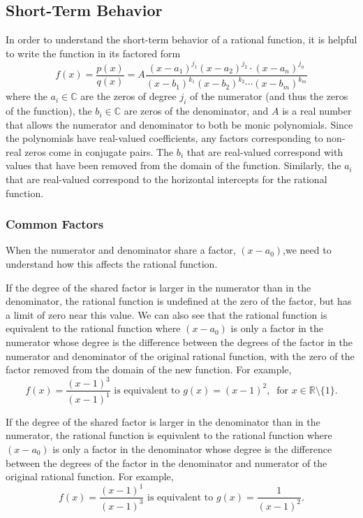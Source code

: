 \documentclass[
]{book}
\theoremstyle{definition}
\theoremstyle{definition}
\theoremstyle{definition}
\theoremstyle{definition}
\theoremstyle{remark}
\begin{document}
\hypertarget{short-term-behavior-1}{%
\subsection{Short-Term Behavior}\label{short-term-behavior-1}}

In order to understand the short-term behavior of a rational function, it is helpful to write the function in its factored form
\[f(x)=\frac{p(x)}{q(x)} = A\frac{ (x-a_1)^{j_1} (x-a_2)^{j_2} \cdot (x-a_n)^{j_n}}{(x-b_1)^{k_1} (x-b_2)^{k_2} \cdots (x-b_m)^{k_m}}\] where the \(a_i\in \mathbb{C}\) are the zeros of degree \(j_i\) of the numerator (and thus the zeros of the function), the \(b_i\in \mathbb{C}\) are zeros of the denominator, and \(A\) is a real number that allows the numerator and denominator to both be monic polynomials. Since the polynomials have real-valued coefficients, any factors corresponding to non-real zeros come in conjugate pairs. The \(b_i\) that are real-valued correspond with values that have been removed from the domain of the function. Similarly, the \(a_i\) that are real-valued correspond to the horizontal intercepts for the rational function.

\hypertarget{common-factors}{%
\subsubsection{Common Factors}\label{common-factors}}

When the numerator and denominator share a factor, \((x-a_0)\),we need to understand how this affects the rational function.

If the degree of the shared factor is larger in the numerator than in the denominator, the rational function is undefined at the zero of the factor, but has a limit of zero near this value. We can also see that the rational function is equivalent to the rational function where \((x-a_0)\) is only a factor in the numerator whose degree is the difference between the degrees of the factor in the numerator and denominator of the original rational function, with the zero of the factor removed from the domain of the new function. For example,
\[f(x)=\frac{(x-1)^3}{(x-1)^1} \mbox{ is equivalent to } g(x)=(x-1)^2, \: \mbox{ for } x\in \mathbb{R}\setminus\{1\}.\]

If the degree of the shared factor is larger in the denominator than in the numerator, the rational function is equivalent to the rational function where \((x-a_0)\) is only a factor in the denominator whose degree is the difference between the degrees of the factor in the denominator and numerator of the original rational function.
For example,
\[f(x)=\frac{(x-1)^1}{(x-1)^3} \mbox{ is equivalent to } g(x)=\frac{1}{(x-1)^2}.\]
\end{document}
